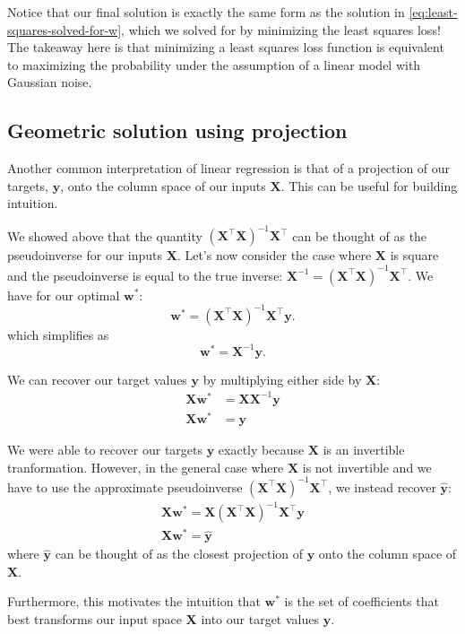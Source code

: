 Notice that our final solution is exactly the same form as the solution in \autoref{eq:least-squares-solved-for-w}, which we solved for by minimizing the least squares loss! The takeaway here is that minimizing a least squares loss function is equivalent to maximizing the probability under the assumption of a linear model with Gaussian noise.

\subsection{Geometric solution using projection}
Another common interpretation of linear regression is that of a projection of our targets, $\mathbf{y}$, onto the column space of our inputs $\mathbf{X}$. This can be useful for building intuition.

We showed above that the quantity $(\mathbf{X}^\top\mathbf{X})^{-1}\mathbf{X}^\top$ can be thought of as the pseudoinverse for our inputs $\mathbf{X}$. Let's now consider the case where $\mathbf{X}$ is square and the pseudoinverse is equal to the true inverse: $\mathbf{X}^{-1} = (\mathbf{X}^\top\mathbf{X})^{-1}\mathbf{X}^\top$. We have for our optimal $\mathbf{w}^*$: $$\mathbf{w}^* = (\mathbf{X}^\top\mathbf{X})^{-1}\mathbf{X}^\top\mathbf{y}.$$
which simplifies as $$\mathbf{w}^* = \mathbf{X}^{-1}\mathbf{y}.$$

We can recover our target values $\mathbf{y}$ by multiplying either side by $\mathbf{X}$:
\begin{align*}
    \mathbf{X}\mathbf{w}^* &= \mathbf{X}\mathbf{X}^{-1}\mathbf{y} \\
    \mathbf{X}\mathbf{w}^* &= \mathbf{y}
\end{align*}

We were able to recover our targets $\mathbf{y}$ exactly because $\mathbf{X}$ is an invertible tranformation. However, in the general case where $\mathbf{X}$ is not invertible and we have to use the approximate pseudoinverse $(\mathbf{X}^\top\mathbf{X})^{-1}\mathbf{X}^\top$, we instead recover $\hat{\mathbf{y}}$:
\begin{align*}
    \mathbf{X}\mathbf{w}^* = \mathbf{X}(\mathbf{X}^\top\mathbf{X})^{-1}\mathbf{X}^\top\mathbf{y} \\
    \mathbf{X}\mathbf{w}^* = \hat{\mathbf{y}}
\end{align*}
where $\hat{\mathbf{y}}$ can be thought of as the closest projection of $\mathbf{y}$ onto the column space of $\mathbf{X}$.

Furthermore, this motivates the intuition that $\mathbf{w}^*$ is the set of coefficients that best transforms our input space $\mathbf{X}$ into our target values $\mathbf{y}$.

